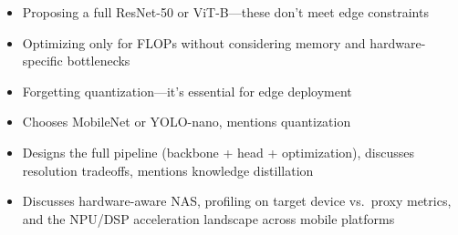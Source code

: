 \begin{interviewq}
\redflags
\begin{itemize}
    \item Proposing a full ResNet-50 or ViT-B---these don't meet edge constraints
    \item Optimizing only for FLOPs without considering memory and hardware-specific bottlenecks
    \item Forgetting quantization---it's essential for edge deployment
\end{itemize}


\goodgreat
\begin{itemize}
    \item {} Chooses MobileNet or YOLO-nano, mentions quantization
    \item {} Designs the full pipeline (backbone + head + optimization), discusses resolution tradeoffs, mentions knowledge distillation
    \item {} Discusses hardware-aware NAS, profiling on target device vs.\ proxy metrics, and the NPU/DSP acceleration landscape across mobile platforms
\end{itemize}

\end{interviewq}

